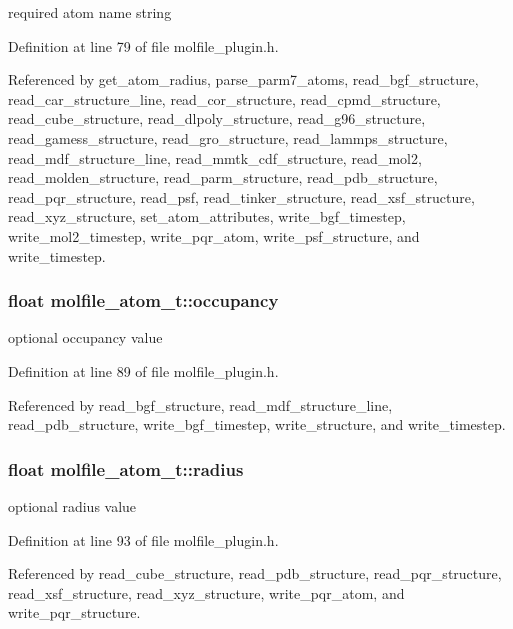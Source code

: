 required atom name string 

Definition at line 79 of file molfile\_\-plugin.h.

Referenced by get\_\-atom\_\-radius, parse\_\-parm7\_\-atoms, read\_\-bgf\_\-structure, read\_\-car\_\-structure\_\-line, read\_\-cor\_\-structure, read\_\-cpmd\_\-structure, read\_\-cube\_\-structure, read\_\-dlpoly\_\-structure, read\_\-g96\_\-structure, read\_\-gamess\_\-structure, read\_\-gro\_\-structure, read\_\-lammps\_\-structure, read\_\-mdf\_\-structure\_\-line, read\_\-mmtk\_\-cdf\_\-structure, read\_\-mol2, read\_\-molden\_\-structure, read\_\-parm\_\-structure, read\_\-pdb\_\-structure, read\_\-pqr\_\-structure, read\_\-psf, read\_\-tinker\_\-structure, read\_\-xsf\_\-structure, read\_\-xyz\_\-structure, set\_\-atom\_\-attributes, write\_\-bgf\_\-timestep, write\_\-mol2\_\-timestep, write\_\-pqr\_\-atom, write\_\-psf\_\-structure, and write\_\-timestep.
\subsubsection{\setlength{\rightskip}{0pt plus 5cm}float molfile\_\-atom\_\-t::occupancy}\label{structmolfile__atom__t_m8}


optional occupancy value 

Definition at line 89 of file molfile\_\-plugin.h.

Referenced by read\_\-bgf\_\-structure, read\_\-mdf\_\-structure\_\-line, read\_\-pdb\_\-structure, write\_\-bgf\_\-timestep, write\_\-structure, and write\_\-timestep.
\subsubsection{\setlength{\rightskip}{0pt plus 5cm}float molfile\_\-atom\_\-t::radius}\label{structmolfile__atom__t_m12}


optional radius value 

Definition at line 93 of file molfile\_\-plugin.h.

Referenced by read\_\-cube\_\-structure, read\_\-pdb\_\-structure, read\_\-pqr\_\-structure, read\_\-xsf\_\-structure, read\_\-xyz\_\-structure, write\_\-pqr\_\-atom, and write\_\-pqr\_\-structure.
